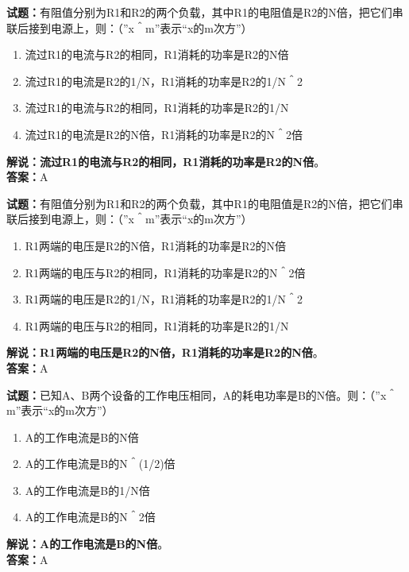 \documentclass{ctexbook}
\begin{document}
\bigskip


\noindent\textbf{试题：}有阻值分别为R1和R2的两个负载，其中R1的电阻值是R2的N倍，把它们串联后接到电源上，则：（”x＾m”表示“x的m次方”）
\begin{enumerate}[leftmargin=3em]
\item 流过R1的电流与R2的相同，R1消耗的功率是R2的N倍
\item 流过R1的电流是R2的1/N，R1消耗的功率是R2的1/N＾2
\item 流过R1的电流与R2的相同，R1消耗的功率是R2的1/N
\item 流过R1的电流是R2的N倍，R1消耗的功率是R2的N＾2倍
\end{enumerate}
\noindent\textbf{解说：}\textbf{流过R1的电流与R2的相同，R1消耗的功率是R2的N倍}。\\\noindent\textbf{答案：}A



\bigskip


\noindent\textbf{试题：}有阻值分别为R1和R2的两个负载，其中R1的电阻值是R2的N倍，把它们串联后接到电源上，则：（”x＾m”表示“x的m次方”）
\begin{enumerate}[leftmargin=3em]
\item R1两端的电压是R2的N倍，R1消耗的功率是R2的N倍
\item R1两端的电压与R2的相同，R1消耗的功率是R2的N＾2倍
\item R1两端的电压是R2的1/N，R1消耗的功率是R2的1/N＾2
\item R1两端的电压与R2的相同，R1消耗的功率是R2的1/N
\end{enumerate}
\noindent\textbf{解说：}\textbf{R1两端的电压是R2的N倍，R1消耗的功率是R2的N倍}。\\\noindent\textbf{答案：}A



\bigskip


\noindent\textbf{试题：}已知A、B两个设备的工作电压相同，A的耗电功率是B的N倍。则：（”x＾m”表示“x的m次方”）
\begin{enumerate}[leftmargin=3em]
\item A的工作电流是B的N倍
\item A的工作电流是B的N＾(1/2)倍
\item A的工作电流是B的1/N倍
\item A的工作电流是B的N＾2倍
\end{enumerate}
\noindent\textbf{解说：}\textbf{A的工作电流是B的N倍}。\\\noindent\textbf{答案：}A



\bigskip
\end{document}
